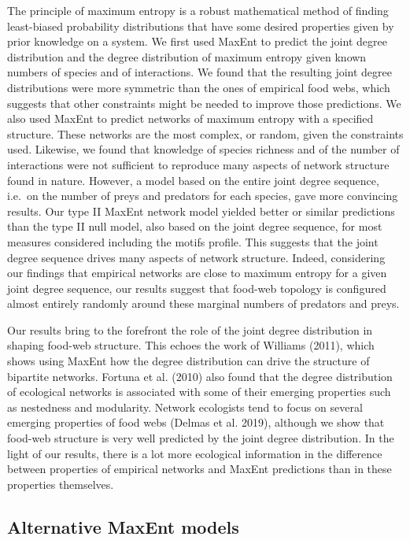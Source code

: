 \documentclass[10pt,oneside]{article}
\begin{document}
The principle of maximum entropy is a robust mathematical method of
finding least-biased probability distributions that have some desired
properties given by prior knowledge on a system. We first used MaxEnt to
predict the joint degree distribution and the degree distribution of
maximum entropy given known numbers of species and of interactions. We
found that the resulting joint degree distributions were more symmetric
than the ones of empirical food webs, which suggests that other
constraints might be needed to improve those predictions. We also used
MaxEnt to predict networks of maximum entropy with a specified
structure. These networks are the most complex, or random, given the
constraints used. Likewise, we found that knowledge of species richness
and of the number of interactions were not sufficient to reproduce many
aspects of network structure found in nature. However, a model based on
the entire joint degree sequence, i.e.~on the number of preys and
predators for each species, gave more convincing results. Our type II
MaxEnt network model yielded better or similar predictions than the type
II null model, also based on the joint degree sequence, for most
measures considered including the motifs profile. This suggests that the
joint degree sequence drives many aspects of network structure. Indeed,
considering our findings that empirical networks are close to maximum
entropy for a given joint degree sequence, our results suggest that
food-web topology is configured almost entirely randomly around these
marginal numbers of predators and preys.

Our results bring to the forefront the role of the joint degree
distribution in shaping food-web structure. This echoes the work of
Williams (2011), which shows using MaxEnt how the degree distribution
can drive the structure of bipartite networks. Fortuna et al. (2010)
also found that the degree distribution of ecological networks is
associated with some of their emerging properties such as nestedness and
modularity. Network ecologists tend to focus on several emerging
properties of food webs (Delmas et al. 2019), although we show that
food-web structure is very well predicted by the joint degree
distribution. In the light of our results, there is a lot more
ecological information in the difference between properties of empirical
networks and MaxEnt predictions than in these properties themselves.

\hypertarget{alternative-maxent-models}{%
\subsection{Alternative MaxEnt models}\label{alternative-maxent-models}}
\end{document}
